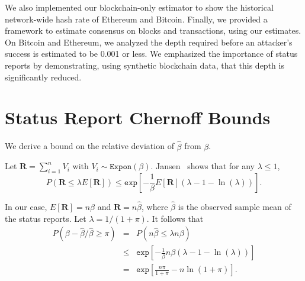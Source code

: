 \documentclass[10pt,sigconf]{acmart}
\newcommand{\para }[1]{\smallskip \noindent {\bf #1}}
\newcommand{\1}{{\em (i)}}
\newcommand{\2}{{\em (ii)}}
\newcommand{\3}{{\em (iii)}}
\newcommand{\4}{{\em (iv)}}
\newcommand{\5}{{\em (v)}}
\begin{document}
We also implemented our blockchain-only estimator to show the
historical network-wide hash rate of Ethereum and Bitcoin. Finally, we provided a framework to
estimate consensus on blocks and transactions, using our estimates. On
Bitcoin and Ethereum, we analyzed the depth required before an
attacker's success is estimated to be 0.001 or less. We emphasized the
importance of status reports by demonstrating, using synthetic blockchain data, that this depth is
significantly reduced.


\appendix


\section{Status Report Chernoff Bounds}\label{sec:sr_chenoff}
We derive a bound on the relative deviation of
$\hat{\beta}$ from $\beta$.

\para{Upper tail bound.}
Let $\textbf{R} = \sum_{i=1}^n V_i$
with $V_i \sim \texttt{Expon}(\beta)$. Jansen~\cite{Janson:2014} shows  that for any $\lambda \leq 1$,   \vspace{-.5ex}
\begin{equation}
P(\textbf{R} \leq \lambda E[\textbf{R}]) \leq \texttt{exp}\left[{-\frac{1}{\beta} E[\textbf{R}] (\lambda - 1 -\ln(\lambda))}\right].
\end{equation}

\noindent In our case, $E[\textbf{R}] = n \beta$ and $\textbf{R} = n \hat{\beta}$, where $\hat{\beta}$ is the observed sample mean of the status reports. Let $\lambda = 1 / (1 + \pi)$. It follows that
\begin{eqnarray}
\label{eq:beta_large_CB}
P\left({\beta-\hat{\beta}}/{\hat{\beta}} \geq \pi \right) & = & P(n \hat{\beta} \leq \lambda n \beta) \nonumber\\
& \leq & \texttt{exp}\left[{-\frac{1}{\beta} n \beta (\lambda - 1 -\ln(\lambda))}\right] \nonumber\\
& = & \texttt{exp}\left[ \frac{n \pi}{1 + \pi} - n \ln(1 + \pi) \right].
\end{eqnarray}
\end{document}
